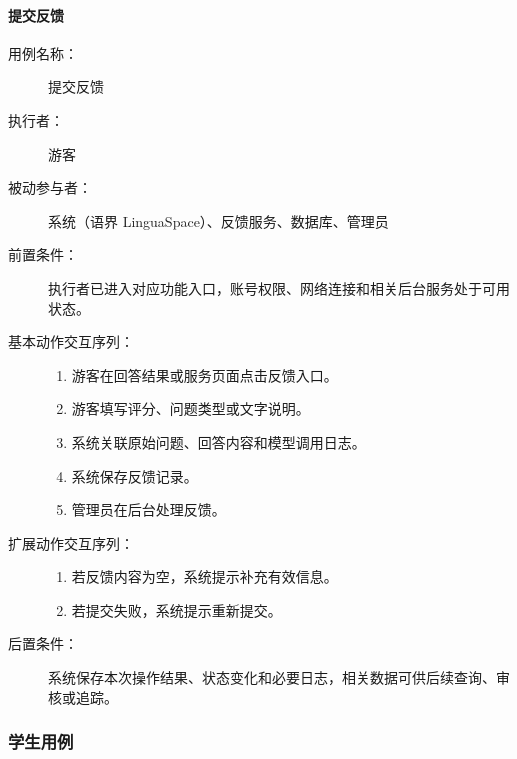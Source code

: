 \paragraph{提交反馈}
\begin{description}
  \item[用例名称：] 提交反馈
  \item[执行者：] 游客
  \item[被动参与者：] 系统（语界 LinguaSpace）、反馈服务、数据库、管理员
  \item[前置条件：] 执行者已进入对应功能入口，账号权限、网络连接和相关后台服务处于可用状态。
  \item[基本动作交互序列：]
  \begin{enumerate}
    \item 游客在回答结果或服务页面点击反馈入口。
    \item 游客填写评分、问题类型或文字说明。
    \item 系统关联原始问题、回答内容和模型调用日志。
    \item 系统保存反馈记录。
    \item 管理员在后台处理反馈。
  \end{enumerate}
  \item[扩展动作交互序列：]
  \begin{enumerate}
    \item[2a.] 若反馈内容为空，系统提示补充有效信息。
    \item[4a.] 若提交失败，系统提示重新提交。
  \end{enumerate}
  \item[后置条件：] 系统保存本次操作结果、状态变化和必要日志，相关数据可供后续查询、审核或追踪。
\end{description}

\subsubsection{学生用例}


